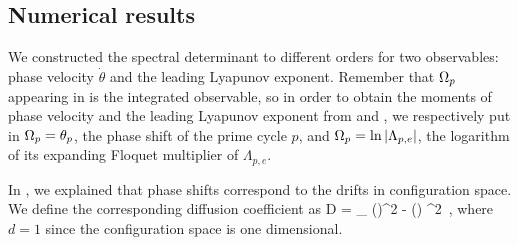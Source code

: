 \subsection{Numerical results}
\label{s-NumResults}

We constructed the spectral determinant  to different
orders for two observables: phase velocity $\dot{\theta}$ and the leading
Lyapunov exponent. Remember that $\Omega_p$ appearing in
 is the integrated observable, so in order to
obtain the moments of phase velocity and the leading Lyapunov exponent from
 and , we respectively put in
$\Omega_p = \theta_p$, the phase shift of the prime cycle $p$, and
$\Omega_p = \ln |\Lambda_{p,e}|$, the logarithm of its expanding Floquet
multiplier of $\Lambda_{p,e}$.

In , we explained that  phase shifts correspond
to the drifts in configuration space. We define the
corresponding diffusion coefficient as
\beq
    D =          \lim_{\zeit \rightarrow \infty} 
        \langle \theta(\zeit)^2 - \langle \theta(\zeit) \rangle^2 \rangle
\,,
\eeq
where $d=1$ since the configuration space is one dimensional.

